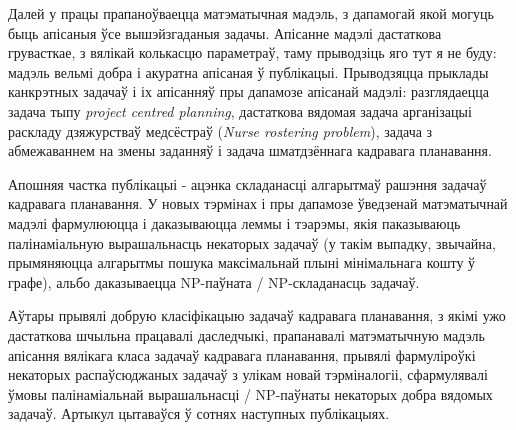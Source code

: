 \documentclass{article}
\begin{document}
Далей у працы прапаноўваецца матэматычная мадэль, з дапамогай якой могуць быць апісаныя ўсе вышэйзгаданыя задачы.
Апісанне мадэлі дастаткова грувасткае, з вялікай колькасцю параметраў, таму прыводзіць яго тут я не буду: мадэль
вельмі добра і акуратна апісаная ў публікацыі. Прыводзяцца прыклады канкрэтных задачаў і іх апісанняў пры дапамозе
апісанай мадэлі: разглядаецца задача тыпу \textit{project centred planning}, дастаткова вядомая задача арганізацыі
раскладу дзяжурстваў медсёстраў (\textit{Nurse rostering problem}), задача з абмежаваннем на змены заданняў і задача
шматдзённага кадравага планавання.

Апошняя частка публікацыі - ацэнка складанасці алгарытмаў рашэння задачаў кадравага планавання. У новых тэрмінах і
пры дапамозе ўведзенай матэматычнай мадэлі фармулююцца і даказываюцца леммы і тэарэмы, якія паказываюць палінаміальную
вырашальнасць некаторых задачаў (у такім выпадку, звычайна, прымяняюцца алгарытмы пошука максімальнай плыні мінімальнага
кошту ў графе), альбо даказываецца NP-паўната / NP-складанасць задачаў.

Аўтары прывялі добрую класіфікацыю задачаў кадравага планавання, з якімі ужо дастаткова шчыльна працавалі даследчыкі,
прапанавалі матэматычную мадэль апісання вялікага класа задачаў кадравага планавання, прывялі фармуліроўкі некаторых
распаўсюджаных задачаў з улікам новай тэрміналогіі, сфармулявалі ўмовы палінаміальнай вырашальнасці / NP-паўнаты
некаторых добра вядомых задачаў. Артыкул цытаваўся ў сотнях наступных публікацыях.

\thispagestyle{empty}
\end{document}
